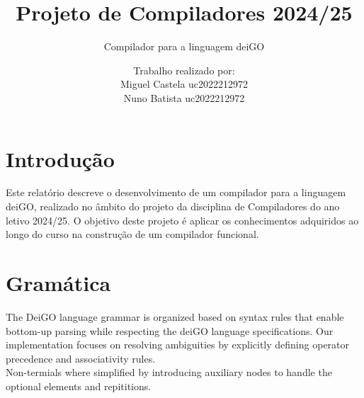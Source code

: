 \documentclass[12pt]{article}
\title{Projeto de Compiladores 2024/25}
\subtitle{Compilador para a linguagem deiGO}
\author{Trabalho realizado por:\\
Miguel Castela uc2022212972 \\
Nuno Batista uc2022212972}
\date{}
\begin{document}
\maketitle

\newpage

\section{Introdução}
Este relatório descreve o desenvolvimento de um compilador para a linguagem deiGO, realizado no âmbito do projeto da disciplina de Compiladores do ano letivo 2024/25. O objetivo deste projeto é aplicar os conhecimentos adquiridos ao longo do curso na construção de um compilador funcional.

\section{Gramática}
The DeiGO language grammar is organized based on syntax rules that enable bottom-up parsing while respecting the deiGO language specifications. Our implementation focuses on resolving ambiguities by explicitly defining operator precedence and associativity rules.\\ Non-termials where simplified by introducing auxiliary nodes to handle the optional elements and repititions.
\end{document}
